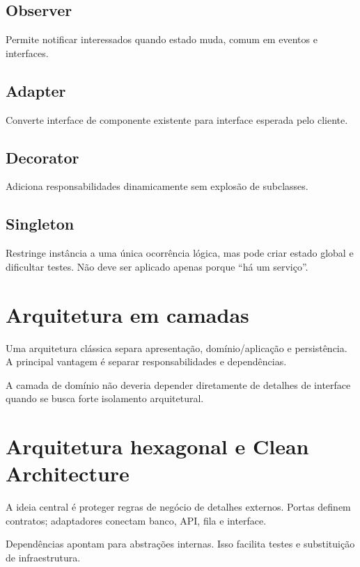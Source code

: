 \subsection{Observer}

Permite notificar interessados quando estado muda, comum em eventos e interfaces.

\subsection{Adapter}

Converte interface de componente existente para interface esperada pelo cliente.

\subsection{Decorator}

Adiciona responsabilidades dinamicamente sem explosão de subclasses.

\subsection{Singleton}

Restringe instância a uma única ocorrência lógica, mas pode criar estado global e dificultar testes. Não deve ser aplicado apenas porque ``há um serviço''.

\section{Arquitetura em camadas}

Uma arquitetura clássica separa apresentação, domínio/aplicação e persistência. A principal vantagem é separar responsabilidades e dependências.

A camada de domínio não deveria depender diretamente de detalhes de interface quando se busca forte isolamento arquitetural.

\section{Arquitetura hexagonal e Clean Architecture}

A ideia central é proteger regras de negócio de detalhes externos. Portas definem contratos; adaptadores conectam banco, API, fila e interface.

Dependências apontam para abstrações internas. Isso facilita testes e substituição de infraestrutura.

